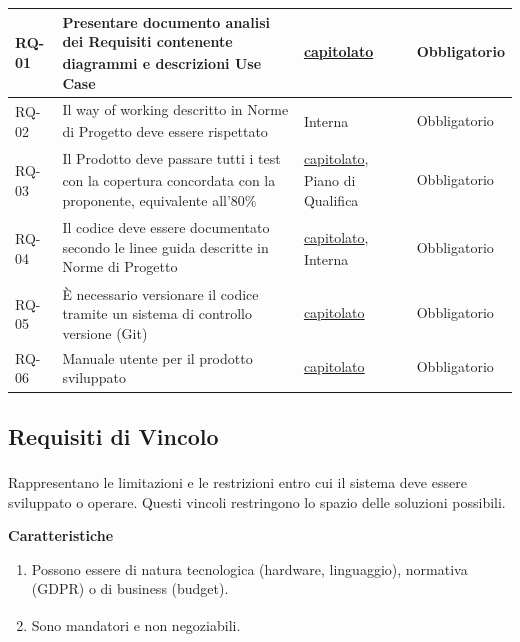 ﻿\documentclass[a4paper,11pt]{article}
\newcommand{\urlcap}{https://www.math.unipd.it/~tullio/IS-1/2025/Progetto/C5.pdf}
\begin{document}
\begin{longtable}{|L{\wCod}|L{\wDesc}|L{\wFonti}|L{\wPrio}|}
    RQ-01 & Presentare documento analisi dei Requisiti\textsubscript{} contenente diagrammi e descrizioni Use Case & \href{\urlcap}{capitolato\textsubscript{}} & Obbligatorio\textsubscript{} \\
    \hline
    RQ-02 & Il way of working\textsubscript{} descritto in Norme di Progetto\textsubscript{} deve essere rispettato & Interna & Obbligatorio\textsubscript{} \\
    \hline
    RQ-03 & Il Prodotto\textsubscript{} deve passare tutti i test\textsubscript{} con la copertura concordata con la proponente\textsubscript{}, equivalente all'80\% & \href{\urlcap}{capitolato\textsubscript{}}, Piano di Qualifica\textsubscript{} & Obbligatorio\textsubscript{} \\
    \hline
    RQ-04 & Il codice deve essere documentato secondo le linee guida descritte in Norme di Progetto\textsubscript{} & \href{\urlcap}{capitolato\textsubscript{}}, Interna & Obbligatorio\textsubscript{} \\
    \hline
    RQ-05 & È necessario versionare il codice tramite un sistema di controllo versione (Git) & \href{\urlcap}{capitolato\textsubscript{}} & Obbligatorio\textsubscript{} \\
    \hline
    RQ-06 & Manuale utente per il prodotto sviluppato & \href{\urlcap}{capitolato\textsubscript{}} & Obbligatorio\textsubscript{} \\
    \hline

\end{longtable}

\subsection{Requisiti di Vincolo\textsubscript{}}
Rappresentano le limitazioni e le restrizioni entro cui il sistema deve essere sviluppato o operare. Questi vincoli restringono lo spazio delle soluzioni possibili.
\vspace{0.5cm}

\textbf{Caratteristiche}
\begin{enumerate}
    \item Possono essere di natura tecnologica (hardware, linguaggio), normativa (GDPR\textsubscript{}) o di business (budget).
    \item Sono mandatori e non negoziabili.
\end{enumerate}
\end{document}
